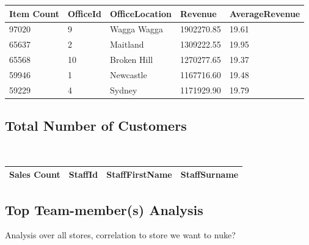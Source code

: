 \documentclass{article}
\begin{document}
                \begin{table}[H]
                    \centering
                    \begin{tabular}{|l|l|l|l|l|}
                    \hline
                    Item Count & OfficeId & OfficeLocation & Revenue    & AverageRevenue \\ \hline
                    97020      & 9        & Wagga Wagga    & 1902270.85 & 19.61          \\ \hline
                    65637      & 2        & Maitland       & 1309222.55 & 19.95          \\ \hline
                    65568      & 10       & Broken Hill    & 1270277.65 & 19.37          \\ \hline
                    59946      & 1        & Newcastle      & 1167716.60 & 19.48          \\ \hline
                    59229      & 4        & Sydney         & 1171929.90 & 19.79          \\ \hline
                    \end{tabular}
                    \end{table}

            \subsection{Total Number of Customers}

            \begin{lstlisting}
                
            \end{lstlisting}

            \begin{table}[H]
                \centering
                \begin{tabular}{|l|l|l|l|}
                \hline
                Sales Count & StaffId & StaffFirstName & StaffSurname \\ \hline
                \end{tabular}
                \end{table}

            \subsection{Top Team-member(s) Analysis}
                Analysis over all stores, correlation to store we want to nuke?

                \begin{lstlisting}
                   
                \end{lstlisting}
\end{document}
